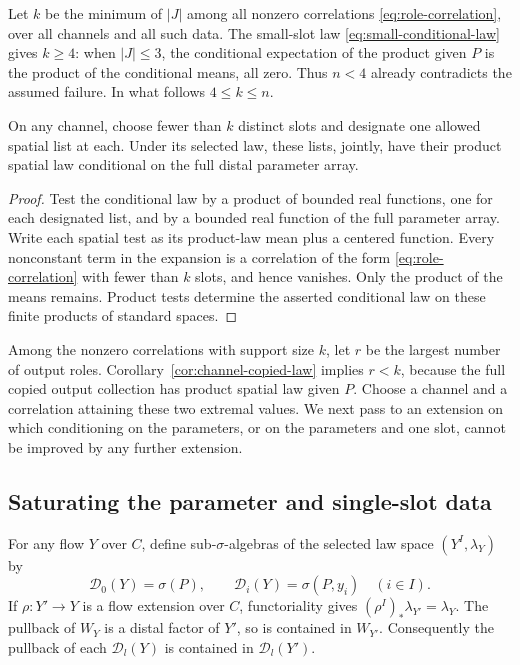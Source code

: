 Let $k$ be the minimum of $|J|$ among all nonzero correlations
\eqref{eq:role-correlation}, over all channels and all such data.
The small-slot law \eqref{eq:small-conditional-law} gives $k\geq4$:
when $|J|\leq3$, the conditional expectation of the product given $P$
is the product of the conditional means, all zero. Thus $n<4$ already
contradicts the assumed failure. In what follows $4\leq k\leq n$.

\begin{lemma}
\label{lem:minimum-product}
On any channel, choose fewer than $k$ distinct slots and designate
one allowed spatial list at each. Under its selected law, these lists,
jointly, have their product spatial law conditional on the full distal
parameter array.
\end{lemma}

\begin{proof}
Test the conditional law by a product of bounded real functions, one
for each designated list, and by a bounded real function of the full
parameter array. Write each spatial test as its product-law mean plus
a centered function. Every nonconstant term in the expansion is a
correlation of the form \eqref{eq:role-correlation} with fewer than $k$
slots, and hence vanishes. Only the product of the means remains.
Product tests determine the asserted conditional law on these finite
products of standard spaces.
\end{proof}

Among the nonzero correlations with support size $k$, let $r$ be the
largest number of output roles. Corollary~\ref{cor:channel-copied-law}
implies $r<k$, because the full copied output collection has product
spatial law given $P$. Choose a channel and a correlation attaining
these two extremal values. We next pass to an extension on which
conditioning on the parameters, or on the parameters and one slot,
cannot be improved by any further extension.

\subsection{Saturating the parameter and single-slot data}

For any flow $Y$ over $C$, define sub-$\sigma$-algebras of the selected
law space $(Y^I,\lambda_Y)$ by
\begin{equation}
 \mathcal D_0(Y)=\sigma(P),\qquad
 \mathcal D_i(Y)=\sigma(P,y_i)\quad(i\in I).
 \label{eq:data-algebras}
\end{equation}
If $\rho:Y'\to Y$ is a flow extension over $C$, functoriality gives
$(\rho^I)_*\lambda_{Y'}=\lambda_Y$. The pullback of $W_Y$ is a distal
factor of $Y'$, so is contained in $W_{Y'}$. Consequently the pullback
of each $\mathcal D_l(Y)$ is contained in $\mathcal D_l(Y')$.

